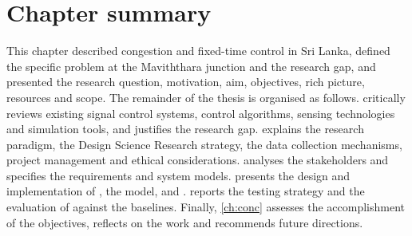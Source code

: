 \section{Chapter summary}\label{sec:intro-summary}

This chapter described congestion and fixed-time control in Sri Lanka, defined the specific problem at the Maviththara junction and the research gap, and presented the research question, motivation, aim, objectives, rich picture, resources and scope. The remainder of the thesis is organised as follows.  critically reviews existing signal control systems, control algorithms, sensing technologies and simulation tools, and justifies the research gap.  explains the research paradigm, the Design Science Research strategy, the data collection mechanisms, project management and ethical considerations.  analyses the stakeholders and specifies the requirements and system models.  presents the design and implementation of \dtx{}, the \sumo{} model, \vls{} and \prism{}.  reports the testing strategy and the evaluation of \prism{} against the baselines. Finally, \cref{ch:conc} assesses the accomplishment of the objectives, reflects on the work and recommends future directions.
